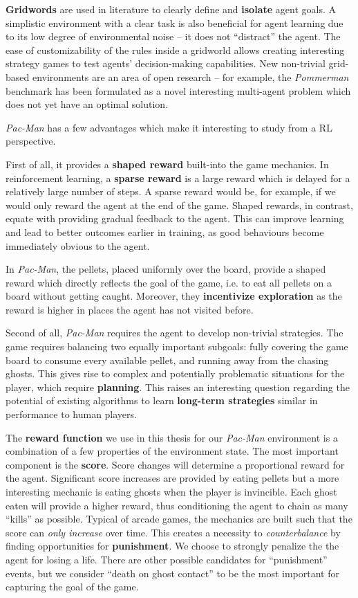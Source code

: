 \textbf{Gridwords} are used in literature to clearly define and \textbf{isolate} agent goals.
A simplistic environment with a clear task is also beneficial for agent learning due to its low degree of environmental noise -- it does not ``distract'' the agent.
The ease of customizability of the rules inside a gridworld allows creating interesting strategy games to test agents’ decision-making capabilities.
New non-trivial grid-based environments are an area of open research -- for example, the \emph{Pommerman} benchmark \cite{pommerman-paper} has been formulated as a novel interesting multi-agent problem which does not yet have an optimal solution.

\emph{Pac-Man} has a few advantages which make it interesting to study from a RL perspective.

First of all, it provides a \textbf{shaped reward} built-into the game mechanics.
In reinforcement learning, a \textbf{sparse reward} is a large reward which is delayed for a relatively large number of steps.
A sparse reward would be, for example, if we would only reward the agent at the end of the game.
Shaped rewards, in contrast, equate with providing gradual feedback to the agent.
This can improve learning and lead to better outcomes earlier in training, as good behaviours become immediately obvious to the agent.

In \emph{Pac-Man}, the pellets, placed uniformly over the board, provide a shaped reward which directly reflects the goal of the game, i.e. to eat all pellets on a board without getting caught.
Moreover, they \textbf{incentivize exploration} as the reward is higher in places the agent has not visited before.

Second of all, \emph{Pac-Man} requires the agent to develop non-trivial strategies.
The game requires balancing two equally important subgoals: fully covering the game board to consume every available pellet, and running away from the chasing ghosts.
This gives rise to complex and potentially problematic situations for the player, which require \textbf{planning}.
This raises an interesting question regarding the potential of existing algorithms to learn \textbf{long-term strategies} similar in performance to human players.

The \textbf{reward function} we use in this thesis for our \emph{Pac-Man} environment is a combination of a few properties of the environment state.
The most important component is the \textbf{score}.
Score changes will determine a proportional reward for the agent.
Significant score increases are provided by eating pellets but a more interesting mechanic is eating ghosts when the player is invincible.
Each ghost eaten will provide a higher reward, thus conditioning the agent to chain as many ``kills'' as possible.
Typical of arcade games, the mechanics are built such that the score can \emph{only increase} over time.
This creates a necessity to \emph{counterbalance} by finding opportunities for \textbf{punishment}.
We choose to strongly penalize the the agent for losing a life.
There are other possible candidates for ``punishment'' events, but we consider ``death on ghost contact'' to be the most important for capturing the goal of the game.

